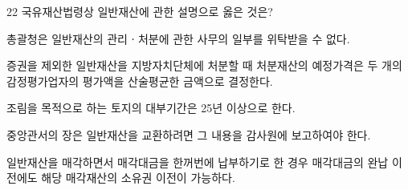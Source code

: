 \begin{question}{22}
국유재산법령상 일반재산에 관한 설명으로 옳은 것은?
\begin{choices}
  \item 총괄청은 일반재산의 관리ㆍ처분에 관한 사무의 일부를 위탁받을 수 없다.
  \item 증권을 제외한 일반재산을 지방자치단체에 처분할 때 처분재산의 예정가격은 두 개의 감정평가업자의 평가액을 산술평균한 금액으로 결정한다.
  \item 조림을 목적으로 하는 토지의 대부기간은 25년 이상으로 한다.
  \item 중앙관서의 장은 일반재산을 교환하려면 그 내용을 감사원에 보고하여야 한다.
  \item 일반재산을 매각하면서 매각대금을 한꺼번에 납부하기로 한 경우 매각대금의 완납 이전에도 해당 매각재산의 소유권 이전이 가능하다.
\end{choices}
\end{question}
